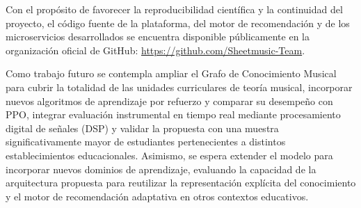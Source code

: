 \documentclass[conference]{IEEEtran}
\begin{document}
Con el propósito de favorecer la reproducibilidad científica y la continuidad del proyecto, el código fuente de la plataforma, del motor de recomendación y de los microservicios desarrollados se encuentra disponible públicamente en la organización oficial de GitHub: \url{https://github.com/Sheetmusic-Team}.

Como trabajo futuro se contempla ampliar el Grafo de Conocimiento Musical para cubrir la totalidad de las unidades curriculares de teoría musical, incorporar nuevos algoritmos de aprendizaje por refuerzo y comparar su desempeño con PPO, integrar evaluación instrumental en tiempo real mediante procesamiento digital de señales (DSP) y validar la propuesta con una muestra significativamente mayor de estudiantes pertenecientes a distintos establecimientos educacionales. Asimismo, se espera extender el modelo para incorporar nuevos dominios de aprendizaje, evaluando la capacidad de la arquitectura propuesta para reutilizar la representación explícita del conocimiento y el motor de recomendación adaptativa en otros contextos educativos.



\end{document}

